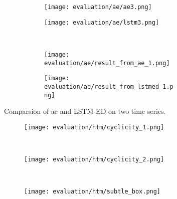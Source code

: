 \begin{figure}[htp!]
    \begin{subfigure}[b]{\linewidth}
        \begin{subfigure}[b]{.45\linewidth}
            \centering
            \texttt{[image: evaluation/ae/ae3.png]}
        \end{subfigure}
        \hfill
        \begin{subfigure}[b]{.45\linewidth}
            \centering
            \texttt{[image: evaluation/ae/lstm3.png]}
        \end{subfigure}
        \label{fig:lstm-vs-ae1}
    \end{subfigure}
    \\
    \begin{subfigure}[b]{\linewidth}
        \begin{subfigure}[b]{.45\linewidth}
            \centering
            \texttt{[image: evaluation/ae/result\_from\_ae\_1.png]}
        \end{subfigure}
        \hfill
        \begin{subfigure}[b]{.45\linewidth}
            \centering
            \texttt{[image: evaluation/ae/result\_from\_lstmed\_1.png]}
        \end{subfigure}
        \label{fig:lstm-vs-ae2}
    \end{subfigure}
\caption{Comparsion of \gls{ae} and LSTM-ED on two time series.}\label{fig:lstm-vs-ae}
\end{figure}

\begin{figure}[htp!]
    \begin{subfigure}[b]{\linewidth}
        \centering
        \texttt{[image: evaluation/htm/cyclicity\_1.png]}
        \label{fig:htm-cyclicity}
    \end{subfigure}%
    \\
    \begin{subfigure}[b]{\linewidth}
        \centering
        \texttt{[image: evaluation/htm/cyclicity\_2.png]}
        \label{fig:htm-cyclicity2}
    \end{subfigure}%
    \\
    \begin{subfigure}[b]{\linewidth}
        \centering
        \texttt{[image: evaluation/htm/subtle\_box.png]}
        \label{fig:htm-subtle}
    \end{subfigure}
\end{figure}

